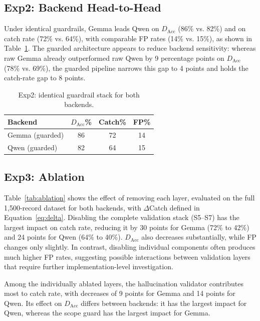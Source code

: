 \documentclass[a4paper,twoside]{article}
\begin{document}
\subsection{Exp2: Backend Head-to-Head}

\noindent Under identical guardrails, Gemma leads Qwen on $D_{\mathrm{Acc}}$ (86\% vs. 82\%) and on catch rate (72\% vs. 64\%), with comparable FP rates (14\% vs. 15\%), as shown in Table~\ref{tab:exp2}. The guarded architecture appears to reduce backend sensitivity: whereas raw Gemma already outperformed raw Qwen by 9 percentage points on $D_{\mathrm{Acc}}$ (78\% vs. 69\%), the guarded pipeline narrows this gap to 4 points and holds the catch-rate gap to 8 points.

\begin{table}[h]
\caption{Exp2: identical guardrail stack for both backends.}\label{tab:exp2}
\centering
\small
\begin{tabular}{|l|c|c|c|}
  \hline
  Backend & $D_{\mathrm{Acc}}$\% & Catch\% & FP\% \\
  \hline
  Gemma (guarded) & 86 & 72 & 14 \\
  Qwen (guarded) & 82 & 64 & 15 \\
  \hline
\end{tabular}
\end{table}

\subsection{Exp3: Ablation}

\noindent Table~\ref{tab:ablation} shows the effect of removing each layer, evaluated on the full 1,500-record dataset for both backends, with $\Delta$Catch defined in Equation~\ref{eq:delta}. Disabling the complete validation stack (S5--S7) has the largest impact on catch rate, reducing it by 30 points for Gemma (72\% to 42\%) and 24 points for Qwen (64\% to 40\%). $D_{\mathrm{Acc}}$ also decreases substantially, while FP changes only slightly. In contrast, disabling individual components often produces much higher FP rates, suggesting possible interactions between validation layers that require further implementation-level investigation.

Among the individually ablated layers, the hallucination validator contributes most to catch rate, with decreases of 9 points for Gemma and 14 points for Qwen. Its effect on $D_{\mathrm{Acc}}$ differs between backends: it has the largest impact for Qwen, whereas the scope guard has the largest impact for Gemma.
\end{document}
